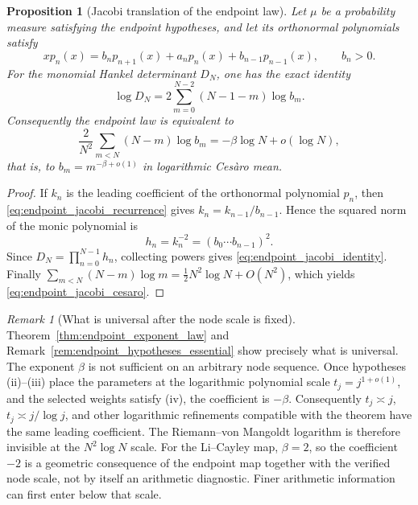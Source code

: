 \documentclass[preprint,12pt]{elsarticle}
\numberwithin{equation}{section}
\theoremstyle{plain}
\newtheorem{proposition}[theorem]{Proposition}
\theoremstyle{definition}
\theoremstyle{remark}
\newtheorem{remark}[theorem]{Remark}
\begin{document}
\begin{proposition}[Jacobi translation of the endpoint law]
\label{prop:endpoint_jacobi_translation}
Let \(\mu\) be a probability measure satisfying the endpoint hypotheses, and let its orthonormal
polynomials satisfy
\begin{equation}
xp_n(x)=b_np_{n+1}(x)+a_np_n(x)+b_{n-1}p_{n-1}(x),
\qquad b_n>0.
\label{eq:endpoint_jacobi_recurrence}
\end{equation}
For the monomial Hankel determinant \(D_N\), one has the exact identity
\begin{equation}
\boxed{\log D_N=2\sum_{m=0}^{N-2}(N-1-m)\log b_m.}
\label{eq:endpoint_jacobi_identity}
\end{equation}
Consequently the endpoint law is equivalent to
\begin{equation}
\frac{2}{N^2}\sum_{m<N}(N-m)\log b_m
=-\beta\log N+o(\log N),
\label{eq:endpoint_jacobi_cesaro}
\end{equation}
that is, to \(b_m=m^{-\beta+o(1)}\) in logarithmic Ces\`aro mean.
\end{proposition}

\begin{proof}
If \(k_n\) is the leading coefficient of the orthonormal polynomial \(p_n\), then
\eqref{eq:endpoint_jacobi_recurrence} gives \(k_n=k_{n-1}/b_{n-1}\).  Hence the squared norm of the
monic polynomial is
\[
h_n=k_n^{-2}=(b_0\cdots b_{n-1})^2.
\]
Since \(D_N=\prod_{n=0}^{N-1}h_n\), collecting powers gives
\eqref{eq:endpoint_jacobi_identity}.  Finally
\(\sum_{m<N}(N-m)\log m=\tfrac12N^2\log N+O(N^2)\), which yields
\eqref{eq:endpoint_jacobi_cesaro}.
\end{proof}

\begin{remark}[What is universal after the node scale is fixed]
\label{rem:what_is_universal}
Theorem~\ref{thm:endpoint_exponent_law} and Remark~\ref{rem:endpoint_hypotheses_essential}
show precisely what is universal.  The exponent \(\beta\) is not sufficient on an arbitrary node
sequence.  Once hypotheses (ii)--(iii) place the parameters at the logarithmic polynomial scale
\(t_j=j^{1+o(1)}\), and the selected weights satisfy (iv), the coefficient is \(-\beta\).
Consequently \(t_j\asymp j\), \(t_j\asymp j/\log j\), and other logarithmic refinements compatible
with the theorem have the same leading coefficient.  The Riemann--von Mangoldt logarithm is
therefore invisible at the \(N^2\log N\) scale.  For the Li--Cayley map, \(\beta=2\), so the
coefficient \(-2\) is a geometric consequence of the endpoint map together with the verified node
scale, not by itself an arithmetic diagnostic.  Finer arithmetic information can first enter below
that scale.
\end{remark}
\end{document}
